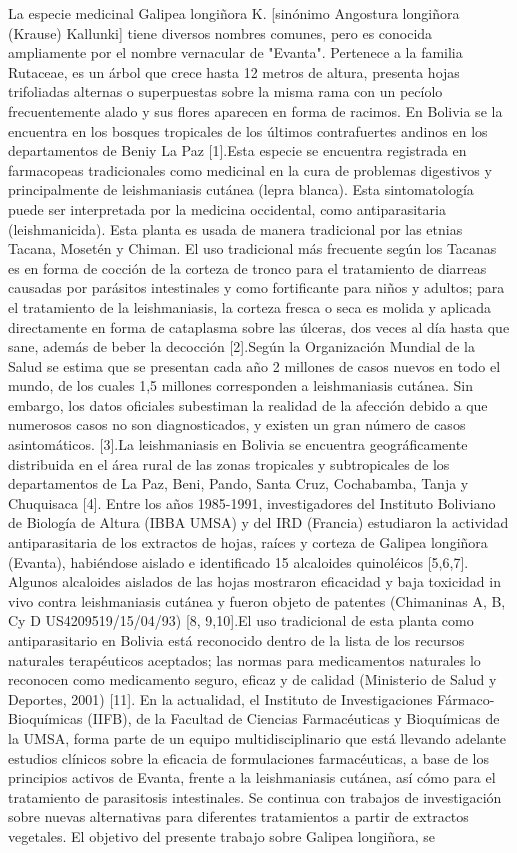\documentclass{article}
\begin{document}
{}{La especie medicinal Galipea longiñora K. [sinónimo Angostura longiñora (Krause) Kallunki] tiene diversos nombres comunes, pero es conocida ampliamente por el nombre vernacular de "Evanta". Pertenece a la familia Rutaceae, es un árbol que crece hasta 12 metros de altura, presenta hojas trifoliadas alternas o superpuestas sobre la misma rama con un pecíolo frecuentemente alado y sus flores aparecen en forma de racimos. En Bolivia se la encuentra en los bosques tropicales de los últimos contrafuertes andinos en los departamentos de Beniy La Paz [1].}{Esta especie se encuentra registrada en farmacopeas tradicionales como medicinal en la cura de problemas digestivos y principalmente de leishmaniasis cutánea (lepra blanca). Esta sintomatología puede ser interpretada por la medicina occidental, como antiparasitaria (leishmanicida). Esta planta es usada de manera tradicional por las etnias Tacana, Mosetén y Chiman. El uso tradicional más frecuente según los Tacanas es en forma de cocción de la corteza de tronco para el tratamiento de diarreas causadas por parásitos intestinales y como fortificante para niños y adultos; para el tratamiento de la leishmaniasis, la corteza fresca o seca es molida y aplicada directamente en forma de cataplasma sobre las úlceras, dos veces al día hasta que sane, además de beber la decocción [2].}{Según la Organización Mundial de la Salud se estima que se presentan cada año 2 millones de casos nuevos en todo el mundo, de los cuales 1,5 millones corresponden a leishmaniasis cutánea. Sin embargo, los datos oficiales subestiman la realidad de la afección debido a que numerosos casos no son diagnosticados, y existen un gran número de casos asintomáticos. [3].}{La leishmaniasis en Bolivia se encuentra geográficamente distribuida en el área rural de las zonas tropicales y subtropicales de los departamentos de La Paz, Beni, Pando, Santa Cruz, Cochabamba, Tanja y Chuquisaca [4]. Entre los años 1985-1991, investigadores del Instituto Boliviano de Biología de Altura (IBBA UMSA) y del IRD (Francia) estudiaron la actividad antiparasitaria de los extractos de hojas, raíces y corteza de Galipea longiñora (Evanta), habiéndose aislado e identificado 15 alcaloides quinoléicos [5,6,7]. Algunos alcaloides aislados de las hojas mostraron eficacidad y baja toxicidad in vivo contra leishmaniasis cutánea y fueron objeto de patentes (Chimaninas A, B, Cy D US4209519/15/04/93) [8, 9,10].}{El uso tradicional de esta planta como antiparasitario en Bolivia está reconocido dentro de la lista de los recursos naturales terapéuticos aceptados; las normas para medicamentos naturales lo reconocen como medicamento seguro, eficaz y de calidad (Ministerio de Salud y Deportes, 2001) [11]. En la actualidad, el Instituto de Investigaciones Fármaco-Bioquímicas (IIFB), de la Facultad de Ciencias Farmacéuticas y Bioquímicas de la UMSA, forma parte de un equipo multidisciplinario que está llevando adelante estudios clínicos sobre la eficacia de formulaciones farmacéuticas, a base de los principios activos de Evanta, frente a la leishmaniasis cutánea, así cómo para el tratamiento de parasitosis intestinales. Se continua con trabajos de investigación sobre nuevas alternativas para diferentes tratamientos a partir de extractos vegetales. El objetivo del presente trabajo sobre Galipea longiñora, se }
\end{document}
